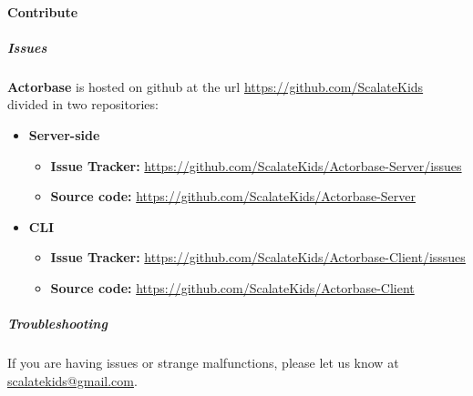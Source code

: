 \documentclass{scalatekids-article}
\begin{document}
\paragraph{Contribute}

\subparagraph{Issues}

\textbf{Actorbase} is hosted on github at the url
\url{https://github.com/ScalateKids} divided in two repositories:

\begin{itemize}
\item\textbf{Server-side}
  \begin{itemize}
  \item \textbf{Issue Tracker:} \url{https://github.com/ScalateKids/Actorbase-Server/issues}
  \item \textbf{Source code:} \url{https://github.com/ScalateKids/Actorbase-Server}
  \end{itemize}
\item\textbf{CLI}
  \begin{itemize}
  \item \textbf{Issue Tracker:} \url{https://github.com/ScalateKids/Actorbase-Client/isssues}
  \item \textbf{Source code:} \url{https://github.com/ScalateKids/Actorbase-Client}
  \end{itemize}
\end{itemize}

\subparagraph{Troubleshooting}

If you are having issues or strange malfunctions, please let us know at
\href{mailto:scalatekids@gmail.com}{scalatekids@gmail.com}.
\end{document}

